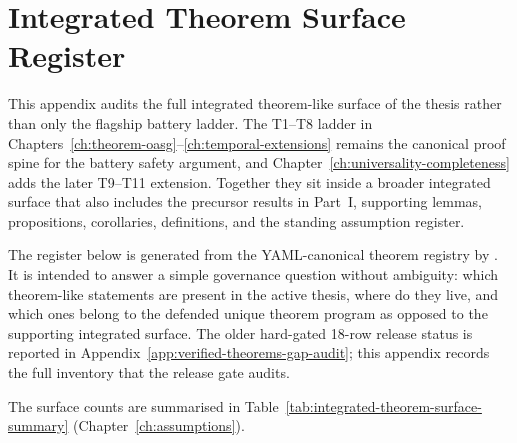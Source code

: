 \chapter{Integrated Theorem Surface Register}
\label{app:integrated-theorem-surface-register}

This appendix audits the full integrated theorem-like surface of the thesis
rather than only the flagship battery ladder.  The T1--T8 ladder in
Chapters~\ref{ch:theorem-oasg}--\ref{ch:temporal-extensions} remains the
canonical proof spine for the battery safety argument, and
Chapter~\ref{ch:universality-completeness} adds the later T9--T11 extension.
Together they sit inside a broader integrated surface that also includes the
precursor results in Part~I, supporting lemmas, propositions, corollaries,
definitions, and the standing assumption register.

The register below is generated from the YAML-canonical theorem registry by
.  It is intended to answer a
simple governance question without ambiguity: which theorem-like statements are
present in the active thesis, where do they live, and which ones belong to the
defended unique theorem program as opposed to the supporting integrated
surface.  The older hard-gated 18-row release status is reported in
Appendix~\ref{app:verified-theorems-gap-audit}; this appendix records the full
inventory that the release gate audits.

The surface counts are summarised in Table~\ref{tab:integrated-theorem-surface-summary}
(Chapter~\ref{ch:assumptions}).

